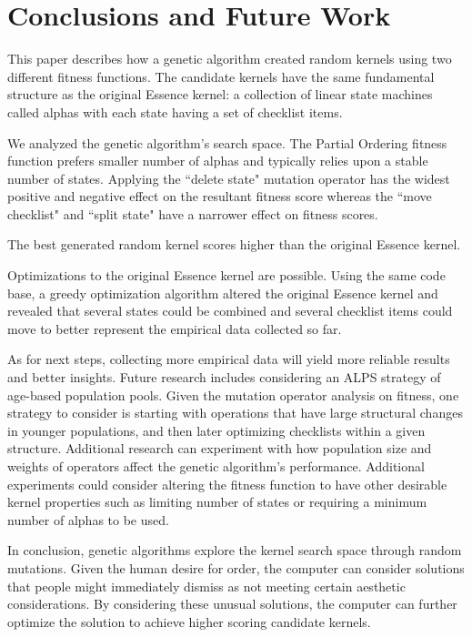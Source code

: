 \documentclass[preprint,12pt,3p]{elsarticle}
\begin{document}
\section{Conclusions and Future Work}

This paper describes how a genetic algorithm created random kernels using two different fitness functions. The candidate kernels have the same fundamental structure as the original Essence kernel: a collection of linear state machines called alphas with each state having a set of checklist items. 

We analyzed the genetic algorithm's search space. The Partial Ordering fitness function prefers smaller number of alphas and typically relies upon a stable number of states. Applying the ``delete state" mutation operator has the widest positive and negative effect on the resultant fitness score whereas the ``move checklist" and ``split state" have a narrower effect on fitness scores. 

The best generated random kernel scores higher than the original Essence kernel. 

Optimizations to the original Essence kernel are possible. Using the same code base, a greedy optimization algorithm altered the original Essence kernel and revealed that several states could be combined and several checklist items could move to better represent the empirical data collected so far.

As for next steps, collecting more empirical data will yield more reliable results and better insights. Future research includes considering an ALPS strategy \cite{ALPS} of age-based population pools. Given the mutation operator analysis on fitness, one strategy to consider is starting with operations that have large structural changes in younger populations, and then later optimizing checklists within a given structure. Additional research can experiment with how population size and weights of operators affect the genetic algorithm's performance. Additional experiments could consider altering the fitness function to have other desirable kernel properties such as limiting number of states or requiring a minimum number of alphas to be used.

In conclusion, genetic algorithms explore the kernel search space through random mutations. Given the human desire for order, the computer can consider solutions that people might immediately dismiss as not meeting certain aesthetic considerations. By considering these unusual solutions, the computer can further optimize the solution to achieve higher scoring candidate kernels. 
\end{document}
